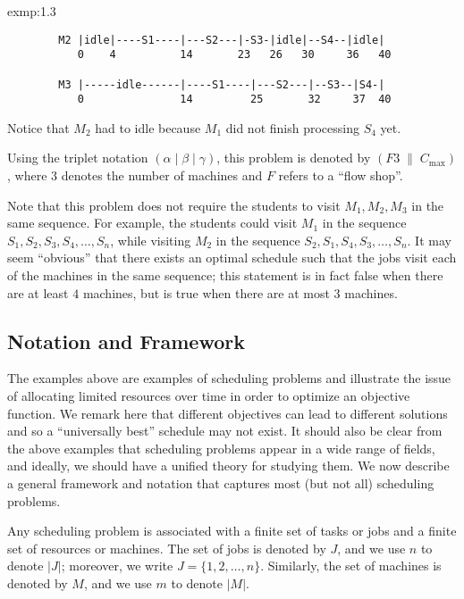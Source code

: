 \begin{exmp}{exmp:1.3}
\begin{verbatim}
        M2 |idle|----S1----|---S2---|-S3-|idle|--S4--|idle|
           0    4          14       23   26   30     36   40 

        M3 |-----idle------|----S1----|---S2---|--S3--|S4-|
           0               14         25       32     37  40 
    \end{verbatim} 
    \vspace{-1em}
    Notice that $M_2$ had to idle because $M_1$ did not finish processing 
    $S_4$ yet. 
    
    Using the triplet notation $(\alpha \mid \beta \mid \gamma)$, 
    this problem is denoted by $(F3\;\|\;C_{\max})$, where $3$ denotes 
    the number of machines and $F$ refers to a ``flow shop''.

    Note that this problem does not require the students to visit $M_1, 
    M_2, M_3$ in the same sequence. For example, the students could 
    visit $M_1$ in the sequence $S_1, S_2, S_3, S_4, \dots, S_n$, while visiting 
    $M_2$ in the sequence $S_2, S_1, S_4, S_3, \dots, S_n$. It may seem 
    ``obvious'' that there exists an optimal schedule such that the jobs 
    visit each of the machines in the same sequence; this statement is 
    in fact false when there are at least $4$ machines, but is true when 
    there are at most $3$ machines. 
\end{exmp}

\subsection{Notation and Framework}\label{subsec:1.2}
The examples above are examples of scheduling problems and illustrate the 
issue of allocating limited resources over time in order to optimize an 
objective function. We remark here that different objectives can lead to 
different solutions and so a ``universally best'' schedule may not exist. 
It should also be clear from the above examples that scheduling problems
appear in a wide range of fields, and ideally, we should have a unified theory 
for studying them. We now describe a general framework and notation that 
captures most (but not all) scheduling problems.

Any scheduling problem is associated with a finite set of tasks or jobs and 
a finite set of resources or machines. The set of jobs is denoted by $J$, 
and we use $n$ to denote $|J|$; moreover, we write $J = \{1, 2, \dots, n\}$. 
Similarly, the set of machines is denoted by $M$, and we use $m$ to denote $|M|$.

